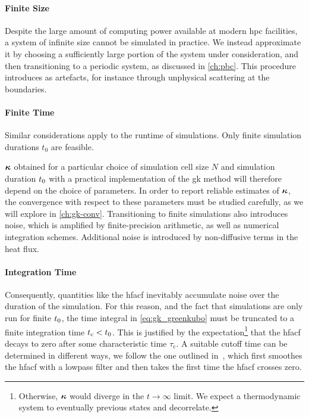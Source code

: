 \paragraph{Finite Size} Despite the large amount of computing power available at modern \gls{hpc} facilities, a system of infinite size cannot be simulated in practice. We instead approximate it by choosing a sufficiently large portion of the system under consideration, and then transitioning to a periodic system, as discussed in \cref{ch:pbc}.
This procedure introduces  as artefacts, for instance through unphysical scattering at the boundaries.

\paragraph{Finite Time} Similar considerations apply to the runtime of simulations. Only finite simulation durations $t_0$ are feasible.

 $\boldsymbol{\kappa}$ obtained for a particular choice of simulation cell size $N$ and simulation duration $t_0$ with a practical implementation of the \gls{gk} method will therefore depend on the choice of parameters. In order to report reliable estimates of $\boldsymbol{\kappa}$, the convergence with respect to these parameters must be studied carefully, as we will explore in \cref{ch:gk-conv}. Transitioning to finite simulations also introduces noise, which is amplified by finite-precision arithmetic, as well as numerical integration schemes. Additional noise is introduced by non-diffusive terms in the heat flux.

\paragraph{Integration Time} Consequently, quantities like the \gls{hfacf} inevitably accumulate noise over the duration of the simulation. For this reason, and the fact that simulations are only run for finite $t_0$, the time integral in \cref{eq:gk_greenkubo} must be truncated to a finite integration time $t_{\text{c}} < t_0$. This is justified by the expectation\footnote{Otherwise, $\boldsymbol{\kappa}$ would diverge in the $t \rightarrow \infty$ limit. We expect a thermodynamic system to eventually  previous states and decorrelate.}
that the \gls{hfacf} decays to zero after some characteristic time $\tau_{\text{c}}$. A suitable cutoff time can be determined in different ways, we follow the one outlined in~\cite{ksc2023t}, which first smoothes the \gls{hfacf} with a lowpass filter and then takes the first time the \gls{hfacf} crosses zero.

